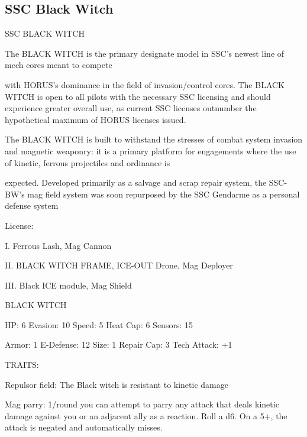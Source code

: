 \subsection{SSC Black Witch}

                                                               
                                            SSC BLACK WITCH  

The BLACK WITCH is the primary designate model in SSC’s newest line of mech cores meant to compete  

with HORUS’s dominance in the field of invasion/control cores. The BLACK WITCH is open to all pilots with  
the necessary SSC licensing and should experience greater overall use, as current SSC licenses outnumber  
the hypothetical maximum of HORUS licenses issued.   

The BLACK WITCH is built to withstand the stresses of combat system invasion and magnetic weaponry: it  
is a primary platform for engagements where the use of kinetic, ferrous projectiles and ordinance is  

expected. Developed primarily as a salvage and scrap repair system, the SSC-BW’s mag field system was  
soon repurposed by the SSC Gendarme as a personal defense system    

                                                                                                                       


                                                  License:
 
I. Ferrous Lash, Mag Cannon
 
II. BLACK WITCH FRAME, ICE-OUT Drone, Mag Deployer
 
III. Black ICE module, Mag Shield
 

                                             BLACK WITCH 

 HP: 6          Evasion: 10                          Speed: 5           Heat Cap: 6        Sensors: 15 

 Armor: 1       E-Defense: 12                        Size: 1            Repair Cap: 3      Tech Attack:  
                                                                                           +1 

                                                  TRAITS: 

 Repulsor field: The Black witch is resistant to kinetic damage
 
 Mag parry: 1/round you can attempt to parry any attack that deals kinetic damage against you or an  
 adjacent ally as a reaction. Roll a d6. On a 5+, the attack is negated and automatically misses. 

